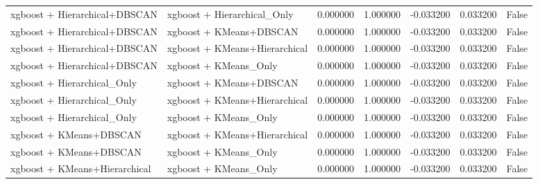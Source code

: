\begin{tabular}{llrrrrr}
xgboost + Hierarchical+DBSCAN & xgboost + Hierarchical_Only & 0.000000 & 1.000000 & -0.033200 & 0.033200 & False \\
xgboost + Hierarchical+DBSCAN & xgboost + KMeans+DBSCAN & 0.000000 & 1.000000 & -0.033200 & 0.033200 & False \\
xgboost + Hierarchical+DBSCAN & xgboost + KMeans+Hierarchical & 0.000000 & 1.000000 & -0.033200 & 0.033200 & False \\
xgboost + Hierarchical+DBSCAN & xgboost + KMeans_Only & 0.000000 & 1.000000 & -0.033200 & 0.033200 & False \\
xgboost + Hierarchical_Only & xgboost + KMeans+DBSCAN & 0.000000 & 1.000000 & -0.033200 & 0.033200 & False \\
xgboost + Hierarchical_Only & xgboost + KMeans+Hierarchical & 0.000000 & 1.000000 & -0.033200 & 0.033200 & False \\
xgboost + Hierarchical_Only & xgboost + KMeans_Only & 0.000000 & 1.000000 & -0.033200 & 0.033200 & False \\
xgboost + KMeans+DBSCAN & xgboost + KMeans+Hierarchical & 0.000000 & 1.000000 & -0.033200 & 0.033200 & False \\
xgboost + KMeans+DBSCAN & xgboost + KMeans_Only & 0.000000 & 1.000000 & -0.033200 & 0.033200 & False \\
xgboost + KMeans+Hierarchical & xgboost + KMeans_Only & 0.000000 & 1.000000 & -0.033200 & 0.033200 & False \\
\bottomrule
\end{tabular}
